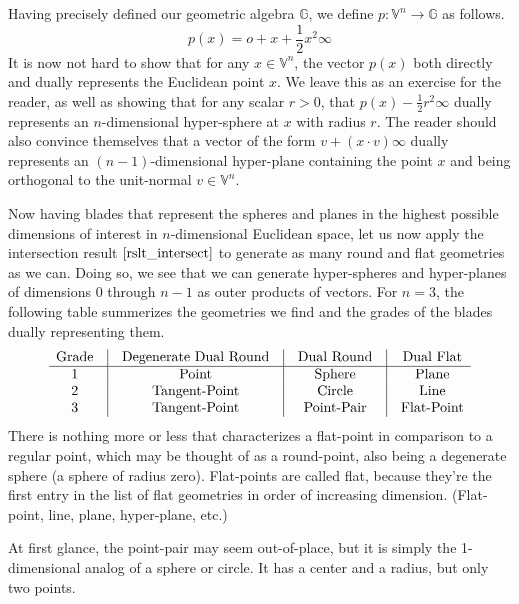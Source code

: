 \documentclass[12pt]{article}
\newcommand{\G}{\mathbb{G}}
\newcommand{\V}{\mathbb{V}}
\newcommand{\nvao}{o}
\newcommand{\nvai}{\infty}
\begin{document}
Having precisely defined our geometric algebra $\G$, we define
$p:\V^n\to\G$ as follows.
\begin{equation*}
p(x) = \nvao + x + \frac{1}{2}x^2\nvai
\end{equation*}
It is now not hard to show that for any $x\in\V^n$, the vector $p(x)$
both directly and dually represents the Euclidean point $x$.  We leave
this as an exercise
for the reader, as well as showing that for any scalar $r>0$, that
$p(x)-\frac{1}{2}r^2\nvai$ dually represents an $n$-dimensional hyper-sphere
at $x$ with radius $r$.  The reader should also convince themselves that a
vector of the form $v+(x\cdot v)\nvai$ dually represents an $(n-1)$-dimensional
hyper-plane containing the
point $x$ and being orthogonal to the unit-normal $v\in\V^n$.

Now having blades that represent the spheres and planes in the highest possible
dimensions of interest in $n$-dimensional Euclidean space, let us now apply
the intersection result $\eqref{rslt_intersect}$ to generate as many round
and flat geometries as we can.  Doing so, we see that we can generate
hyper-spheres and hyper-planes of dimensions $0$ through $n-1$ as
outer products of vectors.  For $n=3$, the following table summerizes
the geometries we find and the grades of the blades dually representing them.
\begin{equation*}
\begin{array}{ccccccc}
\mbox{Grade} & \vline & \mbox{Degenerate Dual Round} & \vline & \mbox{Dual Round} & \vline & \mbox{Dual Flat} \\
\hline
1 & \vline & \mbox{Point} & \vline & \mbox{Sphere} & \vline & \mbox{Plane} \\
2 & \vline & \mbox{Tangent-Point} & \vline & \mbox{Circle} & \vline & \mbox{Line} \\
3 & \vline & \mbox{Tangent-Point} & \vline & \mbox{Point-Pair} & \vline & \mbox{Flat-Point}
\end{array}
\end{equation*}
There is nothing more or less that characterizes a flat-point in comparison
to a regular point, which may be thought of as a round-point, also being
a degenerate sphere (a sphere of radius zero).  Flat-points are called flat,
because they're the first entry in the list of flat geometries in order of
increasing dimension.  (Flat-point, line, plane, hyper-plane, etc.)

At first glance, the point-pair may seem out-of-place, but it is simply
the 1-dimensional analog of a sphere or circle.  It has a center and
a radius, but only two points.
\end{document}
